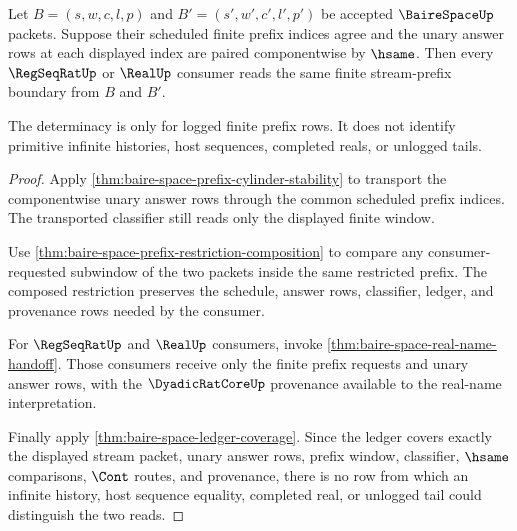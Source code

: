 \begin{theorem}
\label{thm:bairespace-real-stream-prefix-determinacy}
Let $B=(s,w,c,l,p)$ and $B'=(s',w',c',l',p')$ be accepted $\BaireSpaceUp$
packets. Suppose their scheduled finite prefix indices agree and the unary
answer rows at each displayed index are paired componentwise by $\hsame$.
Then every $\RegSeqRatUp$ or $\RealUp$ consumer reads the same finite
stream-prefix boundary from $B$ and $B'$.

The determinacy is only for logged finite prefix rows. It does not identify
primitive infinite histories, host sequences, completed reals, or unlogged
tails.
\end{theorem}
\begin{proof}
Apply \autoref{thm:baire-space-prefix-cylinder-stability} to transport the
componentwise unary answer rows through the common scheduled prefix indices.
The transported classifier still reads only the displayed finite window.

Use \autoref{thm:baire-space-prefix-restriction-composition} to compare any
consumer-requested subwindow of the two packets inside the same restricted
prefix. The composed restriction preserves the schedule, answer rows,
classifier, ledger, and provenance rows needed by the consumer.

For $\RegSeqRatUp$ and $\RealUp$ consumers, invoke
\autoref{thm:baire-space-real-name-handoff}. Those consumers receive only the
finite prefix requests and unary answer rows, with the $\DyadicRatCoreUp$
provenance available to the real-name interpretation.

Finally apply \autoref{thm:baire-space-ledger-coverage}. Since the ledger
covers exactly the displayed stream packet, unary answer rows, prefix window,
classifier, $\hsame$ comparisons, $\Cont$ routes, and provenance, there is no
row from which an infinite history, host sequence equality, completed real, or
unlogged tail could distinguish the two reads.
\end{proof}

